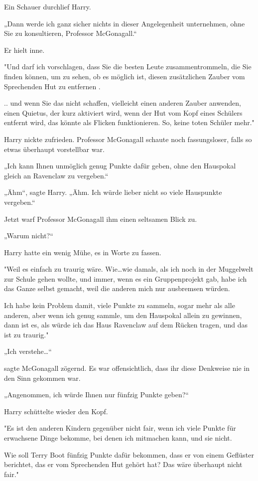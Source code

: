 {Ein Schauer durchlief Harry.

„Dann werde ich ganz sicher nichts in dieser Angelegenheit unternehmen, ohne Sie zu konsultieren, Professor McGonagall.“

Er hielt inne.

"Und darf ich vorschlagen, dass Sie die besten Leute zusammentrommeln, die Sie finden können, um zu sehen, ob es möglich ist, diesen zusätzlichen Zauber vom Sprechenden Hut zu entfernen .

.. und wenn Sie das nicht schaffen, vielleicht einen anderen Zauber anwenden, einen Quietus, der kurz aktiviert wird, wenn der Hut vom Kopf eines Schülers entfernt wird, das könnte als Flicken funktionieren. So, keine toten Schüler mehr."

Harry nickte zufrieden. Professor McGonagall schaute noch fassungsloser, falls so etwas überhaupt vorstellbar war.

„Ich kann Ihnen unmöglich genug Punkte dafür geben, ohne den Hauspokal gleich an Ravenclaw zu vergeben.“

„Ähm“, sagte Harry. „Ähm. Ich würde lieber nicht so viele Hauspunkte vergeben.“

Jetzt warf Professor McGonagall ihm einen seltsamen Blick zu.

„Warum nicht?“

Harry hatte ein wenig Mühe, es in Worte zu fassen.

"Weil es einfach zu traurig wäre. Wie…wie damals, als ich noch in der Muggelwelt zur Schule gehen wollte, und immer, wenn es ein Gruppenprojekt gab, habe ich das Ganze selbst gemacht, weil die anderen mich nur ausbremsen würden.

Ich habe kein Problem damit, viele Punkte zu sammeln, sogar mehr als alle anderen, aber wenn ich genug sammle, um den Hauspokal allein zu gewinnen, dann ist es, als würde ich das Haus Ravenclaw auf dem Rücken tragen, und das ist zu traurig."

„Ich verstehe…“

sagte McGonagall zögernd. Es war offensichtlich, dass ihr diese Denkweise nie in den Sinn gekommen war.

„Angenommen, ich würde Ihnen nur fünfzig Punkte geben?“

Harry schüttelte wieder den Kopf.

"Es ist den anderen Kindern gegenüber nicht fair, wenn ich viele Punkte für erwachsene Dinge bekomme, bei denen ich mitmachen kann, und sie nicht.

Wie soll Terry Boot fünfzig Punkte dafür bekommen, dass er von einem Geflüster berichtet, das er vom Sprechenden Hut gehört hat? Das wäre überhaupt nicht fair."

}
